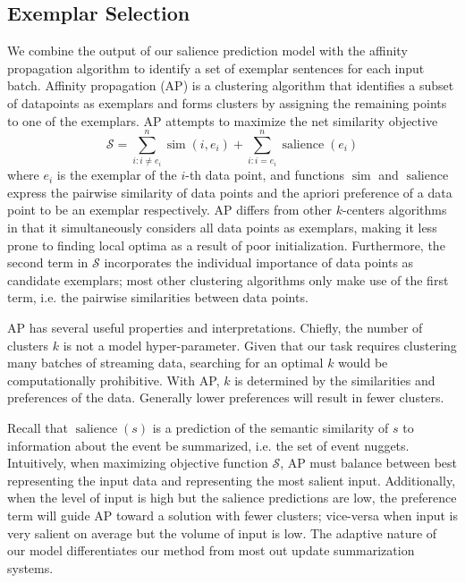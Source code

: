 \subsection{Exemplar Selection}
\label{sec:exsel}

We combine the output of our salience prediction model with the affinity
propagation algorithm to identify a set of exemplar sentences 
for each input batch. 
Affinity propagation (AP) is a clustering algorithm
that identifies a subset of datapoints as exemplars and forms clusters
by assigning the remaining points to one of the exemplars. AP attempts to 
maximize the net similarity objective 
\[ \mathcal{S} = \sum_{i : i \neq e_i}^n \operatorname{sim}(i,e_i) 
+ \sum_{i : i = e_i}^n \operatorname{salience}(e_i)  \]
where $e_i$ is the exemplar of the $i$-th data point, and functions
$\operatorname{sim}$ and $\operatorname{salience}$ express the pairwise 
similarity
of data points and the apriori preference of a data point to be an exemplar
respectively. 
AP differs from other $k$-centers algorithms in that it simultaneously 
considers all data points as exemplars, making it less prone to finding
local optima as a result of poor initialization. Furthermore, the 
second term in $\mathcal{S}$ incorporates the individual importance of 
data points as candidate exemplars; most other clustering algorithms only make
use of the first term, i.e. the pairwise similarities between data points.
 

AP has several useful properties and interpretations. Chiefly, the number
of clusters $k$ is not a model hyper-parameter. Given that our task requires
clustering many batches of streaming data, searching for an optimal $k$ 
would be computationally prohibitive. With AP, $k$ is determined by the
similarities and preferences of the data. Generally lower preferences will
result in fewer clusters.  


Recall that $\operatorname{salience}(s)$
is a prediction of the semantic similarity of $s$ to information about the 
event be summarized, i.e. the set of event nuggets.
Intuitively, when maximizing objective function $\mathcal{S}$, AP must balance
between best representing the input data and representing the most salient
input. Additionally, when the level of input is high but the salience
predictions are low, the preference term will guide AP toward a solution
with fewer clusters; vice-versa when input is very salient on average but
the volume of input is low. The adaptive nature of our model differentiates
our method from most out update summarization systems.





